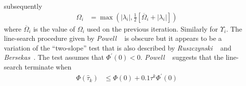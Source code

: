 \documentclass[a4paper,twoside,10pt,english]{report}
\begin{document}
subsequently
\begin{align*}
\Omega_{i} &= \max\left(\left|\lambda_{i}\right|,\frac{1}{2}\left[\overline{\Omega}_{i}+\left|\lambda_{i}\right|\right]\right)
\end{align*}
where $\overline{\Omega}_{i}$ is the value of $\Omega_{i}$ used
on the previous iteration. Similarly for $\Upsilon_{i}$. The line-search
procedure given by \emph{Powell}
~\cite[p.152]{Powell_FastNonlinearConstrainedOptimization}
is obscure but it appears to be a variation of the ``two-slope''
test that is also described by \emph{Ruszczynski}
~\cite[p. 216]{Ruszczynski_NonlinearOptimization}
and \emph{Bersekas}~\cite[p. 28]{Bertsekas_NonlinearProgramming}.
The test assumes that $\Phi^{\prime}\left(0\right)<0$. \emph{Powell}
~\cite[p.152]{Powell_FastNonlinearConstrainedOptimization}
suggests that the line-search terminate when 
\begin{align*}
\Phi\left(\hat{\tau}_{k}\right) & \le \Phi\left(0\right)+0.1\tau^{k}\Phi^{\prime}\left(0\right)
\end{align*}
\end{document}
